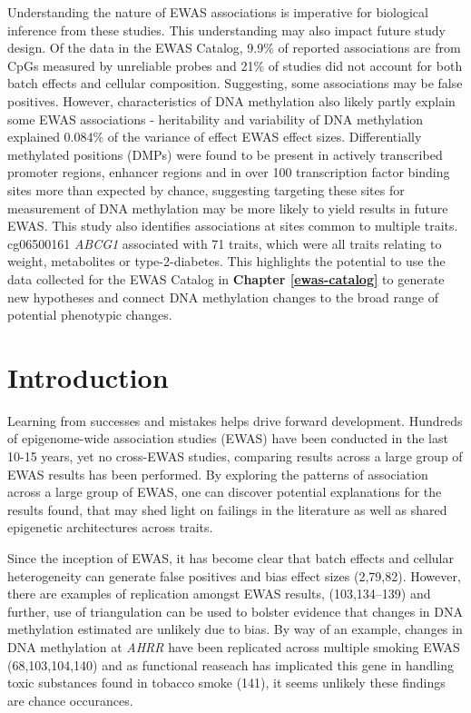 \documentclass[11pt,oneside]{bristolthesis}
\begin{document}
Understanding the nature of EWAS associations is imperative for biological inference from these studies. This understanding may also impact future study design. Of the data in the EWAS Catalog, 9.9\% of reported associations are from CpGs measured by unreliable probes and 21\% of studies did not account for both batch effects and cellular composition. Suggesting, some associations may be false positives. However, characteristics of DNA methylation also likely partly explain some EWAS associations - heritability and variability of DNA methylation explained 0.084\% of the variance of effect EWAS effect sizes. Differentially methylated positions (DMPs) were found to be present in actively transcribed promoter regions, enhancer regions and in over 100 transcription factor binding sites more than expected by chance, suggesting targeting these sites for measurement of DNA methylation may be more likely to yield results in future EWAS. This study also identifies associations at sites common to multiple traits. cg06500161 \emph{ABCG1} associated with 71 traits, which were all traits relating to weight, metabolites or type-2-diabetes. This highlights the potential to use the data collected for the EWAS Catalog in \textbf{Chapter \ref{ewas-catalog}} to generate new hypotheses and connect DNA methylation changes to the broad range of potential phenotypic changes.

\hypertarget{introduction-04}{%
\section{Introduction}\label{introduction-04}}

Learning from successes and mistakes helps drive forward development. Hundreds of epigenome-wide association studies (EWAS) have been conducted in the last 10-15 years, yet no cross-EWAS studies, comparing results across a large group of EWAS results has been performed. By exploring the patterns of association across a large group of EWAS, one can discover potential explanations for the results found, that may shed light on failings in the literature as well as shared epigenetic architectures across traits.

Since the inception of EWAS, it has become clear that batch effects and cellular heterogeneity can generate false positives and bias effect sizes (2,79,82). However, there are examples of replication amongst EWAS results, (103,134--139) and further, use of triangulation can be used to bolster evidence that changes in DNA methylation estimated are unlikely due to bias. By way of an example, changes in DNA methylation at \emph{AHRR} have been replicated across multiple smoking EWAS (68,103,104,140) and as functional reaseach has implicated this gene in handling toxic substances found in tobacco smoke (141), it seems unlikely these findings are chance occurances.
\end{document}
